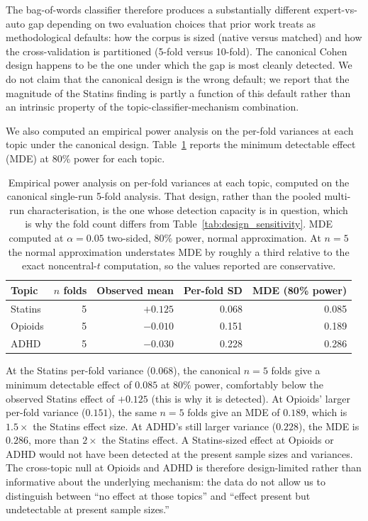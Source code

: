 \documentclass{article}
\begin{document}
The bag-of-words classifier therefore produces a substantially different expert-vs-auto gap depending on two evaluation choices that prior work treats as methodological defaults: how the corpus is sized (native versus matched) and how the cross-validation is partitioned (5-fold versus 10-fold). The canonical Cohen design happens to be the one under which the gap is most cleanly detected. We do not claim that the canonical design is the wrong default; we report that the magnitude of the Statins finding is partly a function of this default rather than an intrinsic property of the topic-classifier-mechanism combination.

We also computed an empirical power analysis on the per-fold variances at each topic under the canonical design. Table~\ref{tab:power} reports the minimum detectable effect (MDE) at 80\% power for each topic.

\begin{table}[h]
\centering
\small
\begin{tabular}{lrrrr}
\toprule
Topic & $n$ folds & Observed mean & Per-fold SD & MDE (80\% power) \\
\midrule
Statins & 5  & $+0.125$ & 0.068 & 0.085 \\
Opioids & 5  & $-0.010$ & 0.151 & 0.189 \\
ADHD    & 5  & $-0.030$ & 0.228 & 0.286 \\
\bottomrule
\end{tabular}
\caption{Empirical power analysis on per-fold variances at each topic, computed on the canonical single-run 5-fold analysis. That design, rather than the pooled multi-run characterisation, is the one whose detection capacity is in question, which is why the fold count differs from Table~\ref{tab:design_sensitivity}. MDE computed at $\alpha = 0.05$ two-sided, 80\% power, normal approximation. At $n = 5$ the normal approximation understates MDE by roughly a third relative to the exact noncentral-$t$ computation, so the values reported are conservative.}
\label{tab:power}
\end{table}

At the Statins per-fold variance ($0.068$), the canonical $n = 5$ folds give a minimum detectable effect of $0.085$ at 80\% power, comfortably below the observed Statins effect of $+0.125$ (this is why it is detected). At Opioids' larger per-fold variance ($0.151$), the same $n = 5$ folds give an MDE of $0.189$, which is $1.5\times$ the Statins effect size. At ADHD's still larger variance ($0.228$), the MDE is $0.286$, more than $2\times$ the Statins effect. A Statins-sized effect at Opioids or ADHD would not have been detected at the present sample sizes and variances. The cross-topic null at Opioids and ADHD is therefore design-limited rather than informative about the underlying mechanism: the data do not allow us to distinguish between ``no effect at those topics'' and ``effect present but undetectable at present sample sizes.''
\end{document}
